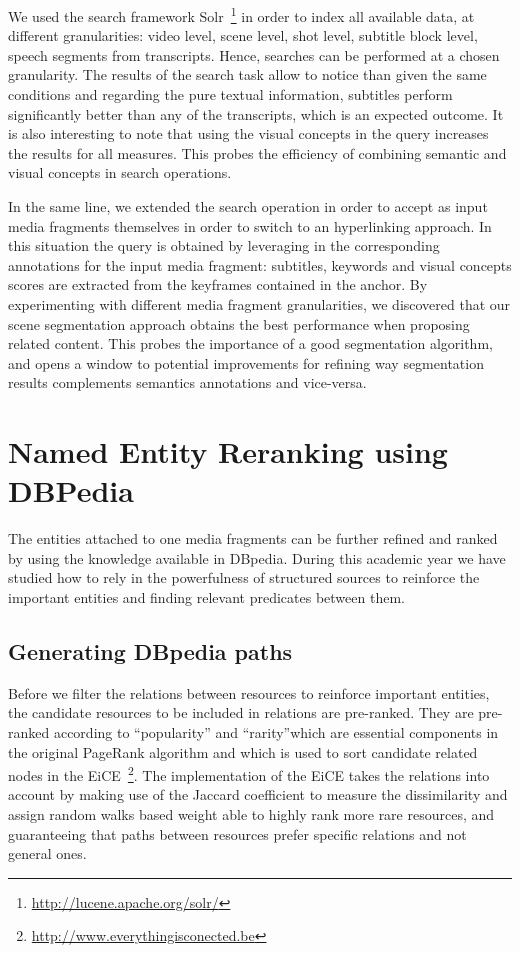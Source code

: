 \documentclass[a4paper,11pt]{report}
\begin{document}
We used the search framework Solr~\footnote{\url{http://lucene.apache.org/solr/}} in order to index all available data, at different granularities: video level, scene level, shot level, subtitle block level, speech segments from transcripts. Hence, searches can be performed at a chosen granularity. The results of the search task allow to notice than given the same conditions and regarding the pure textual information, subtitles perform significantly better than any of the transcripts, which is an expected outcome. It is also interesting to note that using the visual concepts in the query increases the results for all measures. This probes the efficiency of combining semantic and visual concepts in search operations.

In the same line, we extended the search operation in order to accept as input media fragments themselves in order to switch to an hyperlinking approach. In this situation the query is obtained by leveraging in the corresponding annotations for the input media fragment: subtitles, keywords and visual concepts scores are extracted from the keyframes contained in the anchor. By experimenting with different media fragment granularities, we discovered that our scene segmentation approach obtains the best performance when proposing related content. This probes the importance of a good segmentation algorithm, and opens a window to potential improvements for refining way segmentation results complements semantics annotations and vice-versa.


\section*{Named Entity Reranking using DBPedia}

The entities attached to one media fragments can be further refined and ranked by using the knowledge available in DBpedia. During this academic year we have studied how to rely in the powerfulness of structured sources to reinforce the important entities and finding relevant predicates between them.

\subsection*{Generating DBpedia paths}

Before we filter the relations between resources to reinforce important entities, the candidate resources to be included in relations are pre-ranked. They are pre-ranked according to ``popularity'' and ``rarity''which are essential components in the original PageRank algorithm and which is used to sort candidate related nodes in the EiCE~\footnote{\url{http://www.everythingisconected.be}}. The implementation of the EiCE takes the relations into account by making use of the Jaccard coefficient to measure the dissimilarity and assign random walks based weight able to highly rank more rare resources, and guaranteeing that paths between resources prefer specific relations and not general ones.
\end{document}

